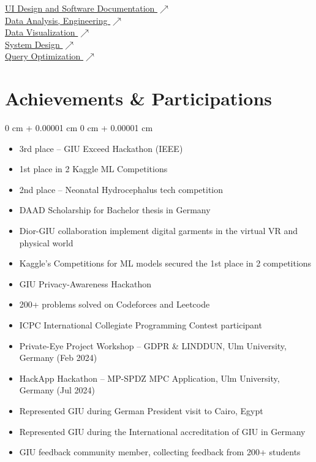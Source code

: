\documentclass[10pt, letterpaper]{article}
\newenvironment{highlightsforbulletentries}{
    \begin{itemize}[
        topsep=0.10 cm,
        parsep=0.10 cm,
        partopsep=0pt,
        itemsep=0pt,
        leftmargin=10pt
    ]
}{
    \end{itemize}
} %
\newenvironment{onecolentry}{
    \begin{adjustwidth}{
        0 cm + 0.00001 cm
    }{
        0 cm + 0.00001 cm
    }
}{
    \end{adjustwidth}
} %
\begin{document}
\href{https://github.com/Abdelrahman-Elnagar/UI_Refactoring/tree/main}{UI Design and Software Documentation $\scriptscriptstyle\nearrow$} \\
\href{https://github.com/Abdelrahman-Elnagar/Visulization_Project/blob/main/Visualization_M1_Final.ipynb}{Data Analysis, Engineering $\scriptscriptstyle\nearrow$} \\
\href{https://github.com/Abdelrahman-Elnagar/Visulization_Project/blob/main/Visualization_M1_Final.ipynb}{Data Visualization $\scriptscriptstyle\nearrow$} \\
\href{https://github.com/Abdelrahman-Elnagar/System_Design/tree/main}{System Design $\scriptscriptstyle\nearrow$} \\
\href{https://github.com/Abdelrahman-Elnagar/Query_Optimization/tree/main}{Query Optimization $\scriptscriptstyle\nearrow$} \\

    \section{Achievements \& Participations}

        \begin{onecolentry}
            \begin{highlightsforbulletentries}
                \item 3rd place – GIU Exceed Hackathon (IEEE)
                \item 1st place in 2 Kaggle ML Competitions
                \item 2nd place – Neonatal Hydrocephalus tech competition
                \item DAAD Scholarship for Bachelor thesis in Germany
                \item Dior-GIU collaboration implement digital garments in the virtual VR and physical world
                \item Kaggle's Competitions for ML models secured the 1st place in 2 competitions
                \item GIU Privacy-Awareness Hackathon
                \item 200+ problems solved on Codeforces and Leetcode
                \item ICPC International Collegiate Programming Contest participant
                \item Private-Eye Project Workshop – GDPR \& LINDDUN, Ulm University, Germany (Feb 2024)
                \item HackApp Hackathon – MP-SPDZ MPC Application, Ulm University, Germany (Jul 2024)
                \item Represented GIU during German President visit to Cairo, Egypt
                \item Represented GIU during the International accreditation of GIU in Germany
                \item GIU feedback community member, collecting feedback from 200+ students
            \end{highlightsforbulletentries}
        \end{onecolentry}
\end{document}
